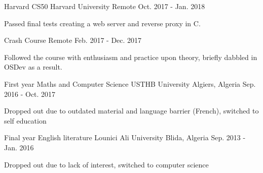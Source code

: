 

\begin{cventries}

  \cventry
    {Harvard CS50} %
    {Harvard University} %
    {Remote} %
    {Oct. 2017 - Jan. 2018} %
    {
      \begin{cvitems} %
        \item {Passed final tests creating a web server and reverse proxy in C.}
      \end{cvitems}
    }

  \cventry
    {Crash Course} %
    {Remote} %
    {Feb. 2017 - Dec. 2017} %
    {
      \begin{cvitems} %
        \item {Followed the course with enthusiasm and practice upon theory, briefly dabbled in OSDev as a result.}
      \end{cvitems}
    }

  \cventry
    {First year Maths and Computer Science} %
    {USTHB University} %
    {Algiers, Algeria} %
    {Sep. 2016 - Oct. 2017} %
    {
      \begin{cvitems} %
        \item {Dropped out due to outdated material and language barrier (French), switched to self education}
      \end{cvitems}
    }

  \cventry
    {Final year English literature} %
    {Lounici Ali University} %
    {Blida, Algeria} %
    {Sep. 2013 - Jan. 2016} %
    {
      \begin{cvitems} %
        \item {Dropped out due to lack of interest, switched to computer science}
      \end{cvitems}
    }

\end{cventries}

